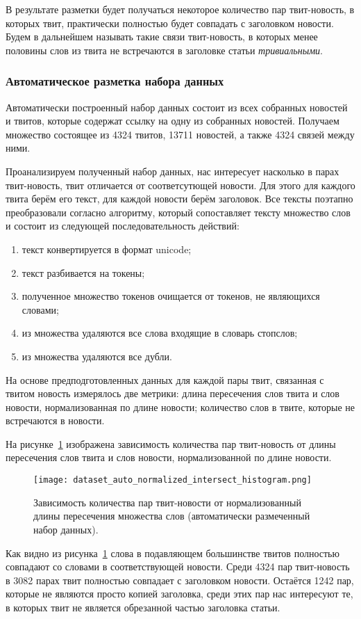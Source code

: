     В результате разметки будет получаться некоторое количество пар твит-новость, в которых твит, практически полностью будет совпадать с заголовком новости.
    Будем в дальнейшем называть такие связи твит-новость, в которых менее половины слов из твита не встречаются в заголовке статьи \textit{тривиальными}.

    \subsubsection{Автоматическое разметка набора данных}
        Автоматически построенный набор данных состоит из всех собранных новостей и твитов, которые содержат ссылку на одну из собранных новостей.
        Получаем множество состоящее из 4324 твитов, 13711 новостей, а также 4324 связей между ними.

        Проанализируем полученный набор данных, нас интересует насколько в парах твит-новость, твит отличается от соответсутющей новости.
        Для этого для каждого твита берём его текст, для каждой новости берём заголовок.
        Все тексты поэтапно преобразовали согласно алгоритму, который сопоставляет тексту множество слов и состоит из следующей последовательность действий:
        \begin{enumerate}
            \item текст конвертируется в формат unicode;
            \item текст разбивается на токены;
            \item полученное множество токенов очищается от токенов, не являющихся словами;
            \item из множества удаляются все слова входящие в словарь стопслов;
            \item из множества удаляются все дубли.
        \end{enumerate}
        На основе предподготовленных данных для каждой пары твит, связанная с твитом новость измерялось две метрики:
        длина пересечения слов твита и слов новости, нормализованная по длине новости;
        количество слов в твите, которые не встречаются в новости.

        На рисунке~\ref{pic:auto_histogram} изображена зависимость количества пар твит-новость от длины пересечения слов твита и слов новости, нормализованной по длине новости.
        \begin{figure}[h!]
            \center
            \texttt{[image: dataset\_auto\_normalized\_intersect\_histogram.png]}
            \caption{Зависимость количества пар твит-новости от нормализованный длины пересечения множества слов (автоматически размеченный набор данных).}
            \label{pic:auto_histogram}
        \end{figure}
        Как видно из рисунка~\ref{pic:auto_histogram} слова в подавляющем большинстве твитов полностью совпадают со словами в соответствующей новости.
        Среди 4324 пар твит-новость в 3082 парах твит полностью совпадает с заголовком новости. Остаётся 1242 пар, которые не являются просто копией заголовка, среди этих пар
        нас интересуют те, в которых твит не является обрезанной частью заголовка статьи.

